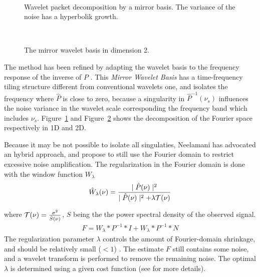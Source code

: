 \documentclass[11pt,a4paper]{article}
\begin{document}
\begin{figure}[htb] 
\centerline{
\hbox{
}}
\caption{Wavelet packet decomposition by a mirror basis. The variance of the
noise has a hyperbolik growth.}
\label{fig_mirror_1d}
\end{figure}
 
\begin{figure}[htb] 
\centerline{
\hbox{
}}
\caption{The mirror wavelet basis in dimension 2.}
\label{fig_mirror_2d}
\end{figure}

The method has been refined by 
adapting the wavelet basis to the frequency response of the inverse of $P$
\cite{rest:kalifa99,rest:kalifa00}. This {\em Mirror Wavelet Basis} has a 
time-frequency tiling structure different from conventional wavelets one,
and isolates the frequency where $\hat{P}$ is close to zero, because 
a singularity in $\hat{P}^{-1}(\nu_s)$ influences the noise variance in
the wavelet scale corresponding the frequency band which includes $\nu_s$.
Figure~\ref{fig_mirror_1d} and Figure~\ref{fig_mirror_2d} 
shows the decomposition of the Fourier space respectively in 1D and 2D.

Because it may be not possible to isolate all singulaties, Neelamani
\cite{rest:neelamani99,rest:neelamani01} has advocated an hybrid approach,
and propose to still use the Fourier domain to restrict excessive noise
amplification. The regularization in the Fourier domain is done with
the window function $W_{\lambda}$
\begin{eqnarray}
   \hat{W}_{\lambda}(\nu) =
 \frac{\mid \hat{P}(\nu) \mid^2}{\mid \hat{P}(\nu) \mid^2 + \lambda {\cal T}(\nu)}
\end{eqnarray}

where ${\cal T}(\nu) = \frac{\sigma^2}{\hat{S}(\nu)}$, $S$ being the the power
spectral density of the observed signal.
\begin{eqnarray}
 F = W_{\lambda} * P^{-1} * I  +  W_{\lambda} * P^{-1} * N  
\end{eqnarray}
The regularization parameter $\lambda$ controls the amount of Fourier-domain
shrinkage, and should be relatively small ($<1$) \cite{rest:neelamani01}.
The estimate $F$ still contains some noise, and a wavelet transform is 
performed to remove the remaining noise. The optimal $\lambda$ is determined
using a given cost function (see \cite{rest:neelamani01} for more details).
\end{document}
